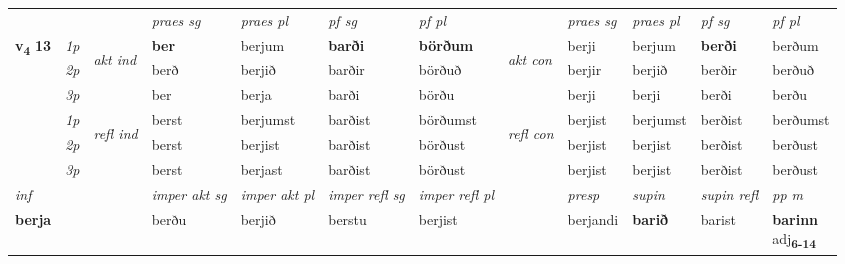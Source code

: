 \begin{longtable}[l]{X>{\footnotesize\itshape}llXXXXlXXXX}
 & &   & \textit{praes sg}  & \textit{praes pl}    & \textit{ pf sg} & \textit{pf pl} & & \textit{praes sg}  & \textit{praes pl}    & \textit{pf sg} & \textit{pf pl }  \\ \cmidrule{4-7} \cmidrule{9-12}
 \multirow{2}{*}{{{\textbf{v{\textsubscript{4}}} \Large{\textbf{13}}}}}  & 1p & \multirow{3}{*}{\begin{turn}{90}\textit{akt ind}\end{turn}} & \textbf{ber} & berjum & \textbf{barði} & \textbf{börðum} & \multirow{3}{*}{\begin{turn}{90}\textit{akt con}\end{turn}} &berji & berjum & \textbf{berði} & berðum\\*
 & 2p &  &  berð  & berjið & barðir & börðuð & & berjir & berjið & berðir & berðuð \\*
 & 3p &  & ber & berja & barði & börðu & & berji & berji& berði & berðu \\*
\cmidrule{4-7} \cmidrule{9-12}
 & 1p & \multirow{3}{*}{\begin{turn}{90}\textit{refl ind}\end{turn}}  & berst & berjumst & barðist & börðumst & \multirow{3}{*}{\begin{turn}{90}\textit{refl con}\end{turn}}  &berjist & berjumst & berðist & berðumst \\*
 & 2p &  & berst & berjist & barðist & börðust & &berjist & berjist & berðist & berðust \\*
 & 3p  & & berst & berjast & barðist & börðust & & berjist & berjist& berðist & berðust \\*
\cmidrule{4-7} \cmidrule{9-12}

   {\textit{inf}} & &  & \textit{imper akt sg} & \textit{imper akt pl} & \textit{imper refl sg} & \textit{imper refl pl} && \textit{presp} & \textit{supin} & \textit{supin refl} & \textit{pp m} \\*
  {\textbf{berja}} & && berðu  & berjið & berstu & berjist && berjandi &  \textbf{barið} & barist & \specialcell{\textbf{barinn} \\ adj\textbf{\textsubscript{6-14}}} \\*

\midrule


\end{longtable}
